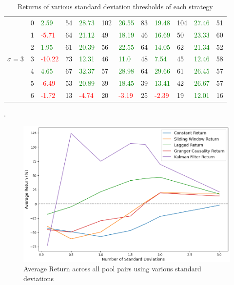 \begin{table}[!htb]
\begin{adjustwidth}{-0.8in}{-0.9in}
\begin{tabular}{|p{4em}|p{2em}|p{3em}|p{3em}|p{3em}|p{3em}|p{3em}|p{3em}|p{3em}|p{3em}|p{3em}|p{3em}|}
            & 0 & \textcolor{green}{2.59} & 54 & \textcolor{green}{28.73} & 102 & \textcolor{green}{26.55} & 83 & \textcolor{green}{19.48} & 104 & \textcolor{green}{27.46} & 51\\\cline{3-12}
            & 1 & \textcolor{red}{-5.71} & 64 & \textcolor{green}{21.12} & 49 & \textcolor{green}{18.19} & 46 & \textcolor{green}{16.69} & 50 & \textcolor{green}{23.33} & 60\\\cline{3-12}
            & 2 & \textcolor{green}{1.95} & 61 & \textcolor{green}{20.39} & 56 & \textcolor{green}{22.55} & 64 & \textcolor{green}{14.05} & 62 & \textcolor{green}{21.34} & 52\\\cline{3-12}
            $\sigma=3$ & 3 & \textcolor{red}{-10.22} & 73 & \textcolor{green}{12.31} & 46 & \textcolor{green}{11.0} & 48 & \textcolor{green}{7.54} & 45 & \textcolor{green}{12.46} & 58\\\cline{3-12}
            & 4 & \textcolor{green}{4.65} & 67 & \textcolor{green}{32.37} & 57 & \textcolor{green}{28.98} & 64 & \textcolor{green}{29.66} & 61 & \textcolor{green}{26.45} & 57\\\cline{3-12}
            & 5 & \textcolor{red}{-6.49} & 53 & \textcolor{green}{20.89} & 39 & \textcolor{green}{18.45} & 39 & \textcolor{green}{13.41} & 42 & \textcolor{green}{26.67} & 57\\\cline{3-12}
            & 6 & \textcolor{red}{-1.72} & 13 & \textcolor{red}{-4.74} & 20 & \textcolor{red}{-3.19} & 25 & \textcolor{red}{-2.39} & 19 & \textcolor{green}{12.01} & 16\\\hline
        \end{tabular}
    \end{adjustwidth}
    \caption{Returns of various standard deviation thresholds of each strategy \label{tab:varying_sigma}}.
\end{table}

\begin{figure}[h!]
    \centering
    \includegraphics[width=1\textwidth]{evaluation/Images/VaryStd.png}
    \caption{Average Return across all pool pairs using various standard deviations}
    \label{fig:varyStd}
\end{figure}

